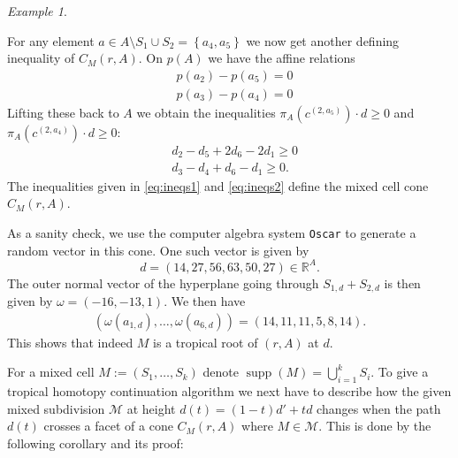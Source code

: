 \documentclass[a4paper]{article}
\theoremstyle{remark}
\newtheorem{example}{Example}
\newcommand{\set}[1]{\left\{#1\right\}}
\def\RR{\mathbb{R}}
\DeclareMathOperator{\supp}{supp}
\begin{document}
\begin{example}
\begin{center}
  \end{center}
  For any element $a\in A\setminus S_1\cup S_2 = \set{a_4,a_5}$ we now get another
  defining inequality of $C_M(r,A)$. On $p(A)$ we have the affine
  relations
  \begin{align*}
    &p(a_2)-p(a_5) = 0\\
    &p(a_3)-p(a_4) = 0
  \end{align*}
  Lifting these back to $A$ we obtain the inequalities
  $\pi_A(c^{(2,a_5)})\cdot d \geq 0$ and $\pi_A(c^{(2,a_4)})\cdot d \geq 0$:
  \begin{equation}
    \label{eq:ineqs2}
    \begin{aligned}
      &d_2-d_5+2d_6-2d_1\geq 0\\
      &d_3-d_4+d_6-d_1\geq 0.
    \end{aligned}
  \end{equation}
  The inequalities given in \eqref{eq:ineqs1} and \eqref{eq:ineqs2}
  define the mixed cell cone $C_M(r,A)$.

  As a sanity check, we use the computer algebra system \texttt{Oscar}
  \cite{OSCAR-book} to generate a random vector in this cone. One such
  vector is given by
  \[d = (14, 27, 56, 63, 50, 27)\in \RR^A.\] The outer normal vector of
  the hyperplane going through $S_{1,d} + S_{2,d}$ is then given by
  $\omega = (-16, -13, 1)$. We then have
  \begin{align*}
    (\omega(a_{1,d}),\hdots, \omega(a_{6,d})) = (14, 11, 11, 5, 8, 14).
  \end{align*}
  This shows that indeed $M$ is a tropical root of $(r, A)$ at $d$.
\end{example}

For a mixed cell $M := (S_1,\hdots,S_k)$ denote
$\supp(M) = \bigcup_{i=1}^kS_i$. To give a tropical homotopy continuation
algorithm we next have to describe how the given mixed subdivision
$\mathcal{M}$ at height $d(t) = (1-t)d' + td$ changes when the path
$d(t)$ crosses a facet of a cone $C_M(r,A)$ where $M\in \mathcal{M}$. This is done by
the following corollary and its proof:
\end{document}
